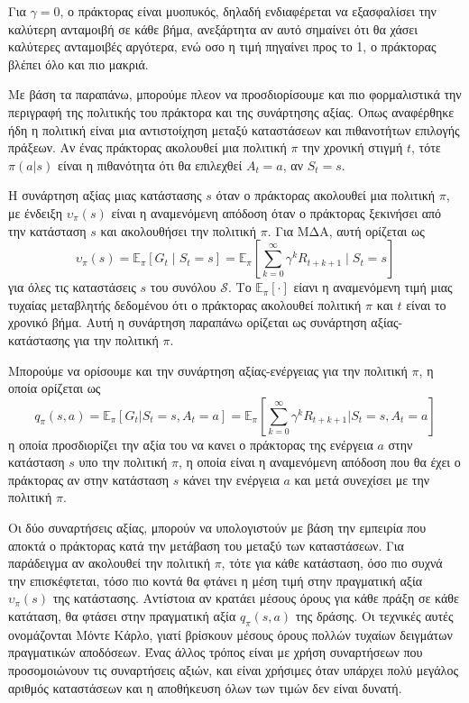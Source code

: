 Για $γ = 0$, ο πράκτορας είναι μυοπυκός, δηλαδή ενδιαφέρεται να εξασφαλίσει την καλύτερη ανταμοιβή σε κάθε βήμα, ανεξάρτητα αν αυτό σημαίνει ότι θα χάσει καλύτερες ανταμοιβές αργότερα, ενώ οσο η τιμή πηγαίνει προς το 1, ο πράκτορας βλέπει όλο και πιο μακριά.

Με βάση τα παραπάνω, μπορούμε πλεον να προσδιορίσουμε και πιο φορμαλιστικά την περιγραφή της πολιτικής του πράκτορα και της συνάρτησης αξίας. Οπως αναφέρθηκε ήδη η πολιτική είναι μια αντιστοίχηση μεταξύ καταστάσεων και πιθανοτήτων επιλογής πράξεων. Αν ένας πράκτορας ακολουθεί μια πολιτική $π$ την χρονική στιγμή $t$, τότε $π(a|s)$ είναι η πιθανότητα ότι θα επιλεχθεί $A_t = a$, αν $S_t =s$.

Η συνάρτηση αξίας μιας κατάστασης $s$ όταν ο πράκτορας ακολουθεί μια πολιτική $π$, με ένδειξη $υ_π(s)$ είναι η αναμενόμενη απόδοση όταν ο πράκτορας ξεκινήσει από την κατάσταση $s$ και ακολουθήσει την πολιτική $π$. Για ΜΔΑ, αυτή ορίζεται ως
\begin{equation}
    υ_π(s) = \mathbb{E}_π[G_t\;|\;S_t = s] = \mathbb{E}_π \left[ \sum_{k=0}^{\infty}γ^kR_{t+k+1}\;\bigg|\;S_t = s\right]
\end{equation}
για όλες τις καταστάσεις $s$ του συνόλου $\mathcal{S}$. Το $\mathbb{E}_π[\cdot]$ είανι η αναμενόμενη τιμή μιας τυχαίας μεταβλητής δεδομένου ότι ο πράκτορας ακολουθεί πολιτική $π$ και $t$ είναι το χρονικό βήμα. Αυτή η συνάρτηση παραπάνω ορίζεται ως συνάρτηση αξίας-κατάστασης για την πολιτική $π$.

Μπορούμε να ορίσουμε και την συνάρτηση αξίας-ενέργειας για την πολιτική $π$, η οποία ορίζεται ως
\begin{equation}
    q_π(s,a) = \mathbb{E}_π[G_t | S_t = s, A_t = a] = \mathbb{E}_π\left[ \sum_{k=0}^{\infty} γ^k R_{t+k+1} \bigg| S_t = s, A_t = a\right]
\end{equation}
η οποία προσδιορίζει την αξία του να κανει ο πράκτορας της ενέργεια $a$ στην κατάσταση $s$ υπο την πολιτική $π$, η οποία είναι η αναμενόμενη απόδοση που θα έχει ο πράκτορας αν στην κατάσταση $s$ κάνει την ενέργεια $a$ και μετά συνεχίσει με την πολιτική $π$.

Οι δύο συναρτήσεις αξίας, μπορούν να υπολογιστούν με βάση την εμπειρία που αποκτά ο πράκτορας κατά την μετάβαση του μεταξύ των καταστάσεων. Για παράδειγμα αν ακολουθεί την πολιτική $π$, τότε για κάθε κατάσταση, όσο πιο συχνά την επισκέφτεται, τόσο πιο κοντά θα φτάνει η μέση τιμή στην πραγματική αξία $υ_π(s)$ της κατάστασης. Αντίστοια αν κρατάει μέσους όρους για κάθε πράξη σε κάθε κατάταση, θα φτάσει στην πραγματική αξία $q_π(s,a)$ της δράσης. Οι τεχνικές αυτές ονομάζονται Μόντε Κάρλο, γιατί βρίσκουν μέσους όρους πολλών τυχαίων δειγμάτων πραγματικών αποδόσεων. Ένας άλλος τρόπος είναι με χρήση συναρτήσεων που προσομοιώνουν τις συναρτήσεις αξιών, και είναι χρήσιμες όταν υπάρχει πολύ μεγάλος αριθμός καταστάσεων και η αποθήκευση όλων των τιμών δεν είναι δυνατή.

